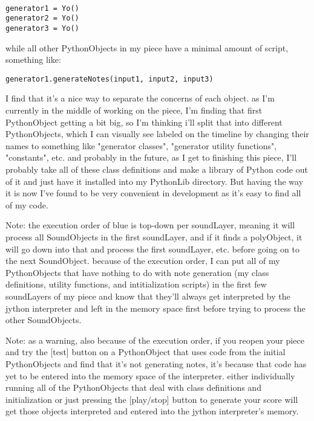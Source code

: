\begin{verbatim}
 
generator1 = Yo()
generator2 = Yo()
generator3 = Yo()
\end{verbatim}

while all other PythonObjects in my piece have a minimal amount of
script, something like:

\begin{verbatim}
generator1.generateNotes(input1, input2, input3)
\end{verbatim}

I find that it's a nice way to separate the concerns of each object. as
I'm currently in the middle of working on the piece, I'm finding that
first PythonObject getting a bit big, so I'm thinking i'll split that
into different PythonObjects, which I can visually see labeled on the
timeline by changing their names to something like "generator classes",
"generator utility functions", "constants", etc. and probably in the
future, as I get to finishing this piece, I'll probably take all of
these class definitions and make a library of Python code out of it and
just have it installed into my PythonLib directory. But having the way
it is now I've found to be very convenient in development as it's easy
to find all of my code.

Note: the execution order of blue is top-down per soundLayer, meaning it
will process all SoundObjects in the first soundLayer, and if it finds a
polyObject, it will go down into that and process the first soundLayer,
etc. before going on to the next SoundObject. because of the execution
order, I can put all of my PythonObjects that have nothing to do with
note generation (my class definitions, utility functions, and
intitialization scripts) in the first few soundLayers of my piece and
know that they'll always get interpreted by the jython interpreter and
left in the memory space first before trying to process the other
SoundObjects.

Note: as a warning, also because of the execution order, if you reopen
your piece and try the {[}test{]} button on a PythonObject that uses
code from the initial PythonObjects and find that it's not generating
notes, it's because that code has yet to be entered into the memory
space of the interpreter. either individually running all of the
PythonObjects that deal with class definitions and initialization or
just pressing the {[}play/stop{]} button to generate your score will get
those objects interpreted and entered into the jython interpreter's
memory.

